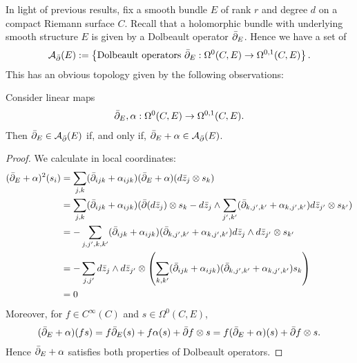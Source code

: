 \documentclass[12pt]{ociamthesis}  %
\begin{document}
In light of previous results, fix a smooth bundle $E$ of rank $r$
and degree $d$ on a compact Riemann surface $C$.
Recall that a holomorphic bundle with underlying smooth structure $E$
is given by a Dolbeault operator $\bar{\partial}_E$. Hence we have a set of
\begin{align*}
  \mathcal A_{\bar{\partial}} (E) := \left\lbrace{
    \text{Dolbeault operators $\bar{\partial}_E : \Omega^0(C,E) \to \Omega^{0,1}(C,E)$}
  }\right\rbrace.
\end{align*}
This has an obvious topology given by the following observations:
\begin{lemma}\label{lem:affine_space_of_dolbeault_operators}
  Consider linear maps
  \begin{align*}
    \bar{\partial}_E,\alpha : \Omega^0(C,E) \to \Omega^{0,1}(C,E).
  \end{align*}
  Then $\bar{\partial}_E\in \mathcal A_{\bar{\partial}} (E)$ if, and only if, $\bar{\partial}_E+\alpha\in \mathcal A_{\bar{\partial}} (E)$.
  \begin{proof}
    We calculate in local coordinates:
    \begin{align*}
      (\bar{\partial}_E + \alpha)^2(s_i)
       & = \sum_{j,k} (\bar{\partial}_{ijk} + \alpha_{ijk})(\bar{\partial}_E + \alpha)( d\bar z_j\otimes s_k)                                                                                     \\
       & = \sum_{j,k} (\bar{\partial}_{ijk} + \alpha_{ijk})(\bar{\partial}(d\bar z_j) \otimes s_k -  d\bar z_j \wedge \sum_{j',k'}(\bar{\partial}_{k,j',k'} + \alpha_{k,j',k'}) d\bar z_{j'}\otimes s_{k'}) \\
       & = - \sum_{j,j',k,k'} (\bar{\partial}_{ijk} + \alpha_{ijk})(\bar{\partial}_{k,j',k'} + \alpha_{k,j',k'}) d\bar z_j \wedge d\bar z_{j'}\otimes s_{k'}                                      \\
       & = - \sum_{j,j'}
      d\bar z_j \wedge d\bar z_{j'}\otimes \left(
      \sum_{k,k'} (\bar{\partial}_{ijk} + \alpha_{ijk})(\bar{\partial}_{k,j',k'} + \alpha_{k,j',k'}) s_{k}\right)                                                                                 \\
       & = 0
    \end{align*}
    Moreover, for $f\in C^\infty(C)$ and $s\in\Omega^0(C,E)$,
    \begin{align*}
      (\bar{\partial}_E + \alpha)(fs) = f\bar{\partial}_E(s) + f\alpha(s) + \bar{\partial} f \otimes s
      = f(\bar{\partial}_E+\alpha)(s) + \bar{\partial} f \otimes s.
    \end{align*}
    Hence $\bar{\partial}_E + \alpha$ satisfies both properties of Dolbeault
    operators.
  \end{proof}
\end{lemma}
\end{document}
